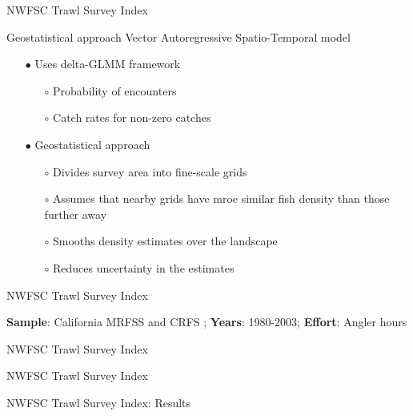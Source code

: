 \documentclass[ignorenonframetext,compress]{beamer}
\begin{document}
\begin{frame}{NWFSC Trawl Survey Index}

Geostatistical approach Vector Autoregressive Spatio-Temporal model

\begin{itemize}
\item[$\bullet$] Uses delta-GLMM framework
\begin{itemize}
\item[$\circ$] Probability of encounters
\item[$\circ$] Catch rates for non-zero catches
\end{itemize}
\item[$\bullet$] Geostatistical approach
\begin{itemize}
\item[$\circ$] Divides survey area into fine-scale grids
\item[$\circ$] Assumes that nearby grids have mroe similar fish density than those further away
\item[$\circ$] Smooths density estimates over the landscape
\item[$\circ$] Reduces uncertainty in the estimates
\end{itemize}
\end{itemize}

\end{frame}

\begin{frame}{NWFSC Trawl Survey Index}

\textbf{Sample}: California MRFSS and CRFS ; \textbf{Years}: 1980-2003;
\textbf{Effort}: Angler hours

\end{frame}

\begin{frame}{NWFSC Trawl Survey Index}

\end{frame}

\begin{frame}{NWFSC Trawl Survey Index}

\end{frame}

\begin{frame}{NWFSC Trawl Survey Index: Results}

\end{frame}
\end{document}
